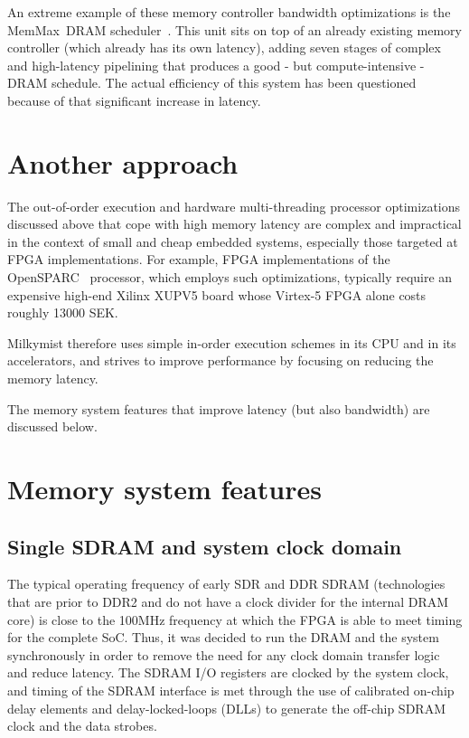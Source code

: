 \documentclass[a4paper,11pt]{kthesis}
\begin{document}
An extreme example of these memory controller bandwidth optimizations is the MemMax\textregistered ~DRAM scheduler~\cite{memmax}. This unit sits on top of an already existing memory controller (which already has its own latency), adding seven stages of complex and high-latency pipelining that produces a good - but compute-intensive - DRAM schedule. The actual efficiency of this system has been questioned~\cite{dramqos} because of that significant increase in latency.

\section{Another approach}
The out-of-order execution and hardware multi-threading processor optimizations discussed above that cope with high memory latency are complex and impractical in the context of small and cheap embedded systems, especially those targeted at FPGA implementations. For example, FPGA implementations of the OpenSPARC~\cite{opensparc} processor, which employs such optimizations, typically require an expensive high-end Xilinx XUPV5 board whose Virtex-5 FPGA alone costs roughly 13000 SEK.

Milkymist therefore uses simple in-order execution schemes in its CPU and in its accelerators, and strives to improve performance by focusing on reducing the memory latency.

The memory system features that improve latency (but also bandwidth) are discussed below.

\section{Memory system features}
\subsection{Single SDRAM and system clock domain}
The typical operating frequency of early SDR and DDR SDRAM (technologies that are prior to DDR2 and do not have a clock divider for the internal DRAM core) is close to the 100MHz frequency at which the FPGA is able to meet timing for the complete SoC. Thus, it was decided to run the DRAM and the system synchronously in order to remove the need for any clock domain transfer logic and reduce latency. The SDRAM I/O registers are clocked by the system clock, and timing of the SDRAM interface is met through the use of calibrated on-chip delay elements and delay-locked-loops (DLLs) to generate the off-chip SDRAM clock and the data strobes.
\end{document}
